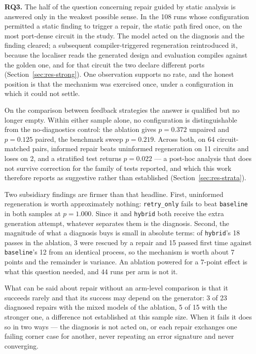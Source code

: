 \documentclass[11pt,a4paper,titlepage=false]{scrreprt}
\begin{document}
\textbf{RQ3.} The half of the question concerning repair guided by static analysis is
answered only in the weakest possible sense. In the 108 runs whose configuration permitted a
static finding to trigger a repair, the static path fired once, on the most port-dense
circuit in the study. The model acted on the diagnosis and the finding cleared; a subsequent
compiler-triggered regeneration reintroduced it, because the localiser reads the generated
design and evaluation compiles against the golden one, and for that circuit the two declare
different ports (Section~\ref{sec:res-strong}). One observation supports no rate, and the
honest position is that the mechanism was exercised once, under a configuration in which it
could not settle.

On the comparison between feedback strategies the answer is qualified but no longer empty.
Within either sample alone, no configuration is distinguishable from the no-diagnostics
control: the ablation gives $p=0.372$ unpaired and $p=0.125$ paired, the benchmark sweep
$p=0.219$. Across both, on 64 circuit-matched pairs, informed repair beats uninformed
regeneration on 11 circuits and loses on 2, and a stratified test returns $p=0.022$ --- a
post-hoc analysis that does not survive correction for the family of tests reported, and which
this work therefore reports as suggestive rather than established
(Section~\ref{sec:res-strata}).

Two subsidiary findings are firmer than that headline. First, uninformed regeneration is worth
approximately nothing: \texttt{retry\_only} fails to beat \texttt{baseline} in both samples
at $p=1.000$. Since it and \texttt{hybrid} both receive the extra generation attempt, whatever
separates them is the diagnosis. Second, the magnitude of what a diagnosis buys is small in
absolute terms: of \texttt{hybrid}'s 18 passes in the ablation, 3 were rescued by a repair and
15 passed first time against \texttt{baseline}'s 12 from an identical process, so the
mechanism is worth about 7 points and the remainder is variance. An ablation powered for a
7-point effect is what this question needed, and 44 runs per arm is not it.

What can be said about repair without an arm-level comparison is that it succeeds rarely and
that its success may depend on the generator: 3 of 23 diagnosed repairs with the mixed models
of the ablation, 5 of 15 with the stronger one, a difference not established at this sample
size. When it fails it does so in two ways --- the
diagnosis is not acted on, or each repair exchanges one failing corner case for another,
never repeating an error signature and never converging.
\end{document}

